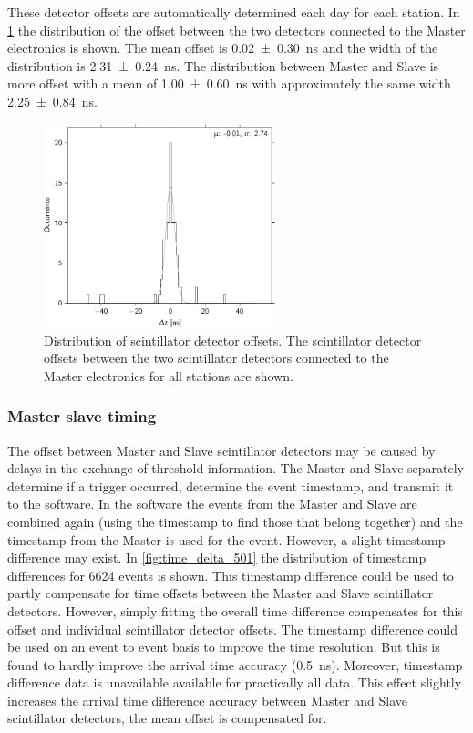 These detector offsets are automatically determined each day for each station. In \cref{fig:detector_offset_distribution} the distribution of the offset between the two detectors connected to the Master electronics is shown. The mean offset is \SI{0.02 \pm 0.30}{\ns} and the width of the distribution is \SI{2.31 \pm 0.24}{\ns}. The distribution between Master and Slave is more offset with a mean of \SI{1.00 \pm 0.60}{\ns} with approximately the same width \SI{2.25 \pm 0.84}{\ns}.

\begin{figure}
    \centering
    \includegraphics[width=0.6\textwidth]
                    {plots/station/detector_offset_distribution}
    \caption{Distribution of scintillator detector offsets. The scintillator detector offsets between the two scintillator detectors connected to the Master electronics for all \hisparc stations are shown.}
    \label{fig:detector_offset_distribution}
\end{figure}


\subsubsection{Master slave timing}
\label{sec:master_slave_timing}

The offset between Master and Slave scintillator detectors may be caused by delays in the exchange of threshold information. The Master and Slave separately determine if a trigger occurred, determine the event timestamp, and  transmit it to the \daq software. In the \daq software the events from the Master and Slave are combined again (using the timestamp to find those that belong together) and the timestamp from the Master is used for the event. However, a slight timestamp difference may exist. In \cref{fig:time_delta_501} the distribution of timestamp differences for \num{6624} events is shown. This timestamp difference could be used to partly compensate for time offsets between the Master and Slave scintillator detectors. However, simply fitting the overall time difference compensates for this offset and individual scintillator detector offsets. The timestamp difference could be used on an event to event basis to improve the time resolution. But this is found to hardly improve the arrival time accuracy (\SI{0.5}{\ns}). Moreover, timestamp difference data is unavailable available for practically all \hisparc data. This effect slightly increases the arrival time difference accuracy between Master and Slave scintillator detectors, the mean offset is compensated for.


